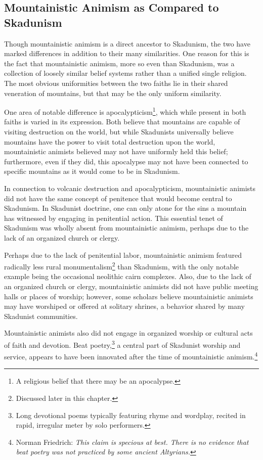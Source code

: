 \subsection{Mountainistic Animism as Compared to Skadunism}

Though mountainistic animism is a direct ancestor to Skadunism, the two have marked differences in addition to their many similarities. One reason for this is the fact that mountainistic animism, more so even than Skadunism, was a collection of loosely similar belief systems rather than a unified single religion. The most obvious uniformities between the two faiths lie in their shared veneration of mountains, but that may be the only uniform similarity. \par 

One area of notable difference is apocalypticism\footnote{A religious belief that there may be an apocalypse.}, which while present in both faiths is varied in its expression. Both believe that mountains are capable of visiting destruction on the world, but while Skadunists universally believe mountains have the power to visit total destruction upon the world, mountainistic animists believed may not have uniformly held this belief; furthermore, even if they did, this apocalypse may not have been connected to specific mountains as it would come to be in Skadunism.\par 

In connection to volcanic destruction and apocalypticism, mountainistic animists did not have the same concept of penitence that would become central to Skadunism. In Skadunist doctrine, one can only atone for the sins a mountain has witnessed by engaging in penitential action. This essential tenet of Skadunism was wholly absent from mountainistic animism, perhaps due to the lack of an organized church or clergy.\par 

Perhaps due to the lack of penitential labor, mountainistic animism featured radically less rural monumentalism\footnote{Discussed later in this chapter.} than Skadunism, with the only notable example being the occasional neolithic cairn complexes. Also, due to the lack of an organized church or clergy, mountainistic animists did not have public meeting halls or places of worship; however, some scholars believe mountainistic animists may have worshiped or offered at solitary shrines, a behavior shared by many Skadunist communities.\par 

Mountainistic animists also did not engage in organized worship or cultural acts of faith and devotion. Beat poetry,\footnote{Long devotional poems typically featuring rhyme and wordplay, recited in rapid, irregular meter by solo performers.} a central part of Skadunist worship and service, appears to have been innovated after the time of mountainistic animism.\footnote{Norman Friedrich: \textit{This claim is specious at best. There is no evidence that beat poetry was not practiced by some ancient Altyrians.}}


